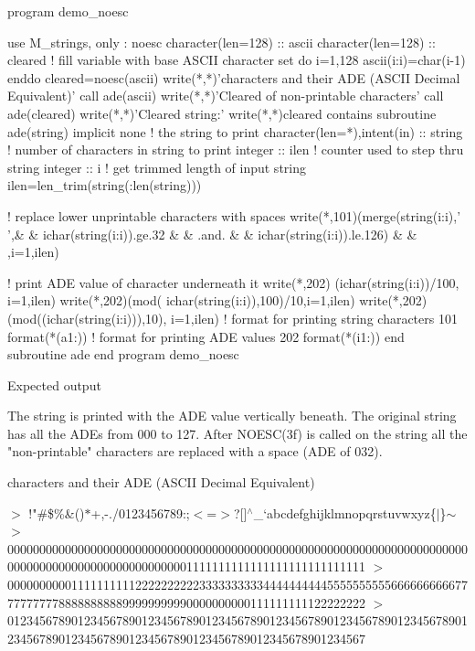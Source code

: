 \begin{DoxyVerb}program demo_noesc

 use M_strings, only : noesc
 character(len=128) :: ascii
 character(len=128) :: cleared
 ! fill variable with base ASCII character set
 do i=1,128
    ascii(i:i)=char(i-1)
 enddo
 cleared=noesc(ascii)
 write(*,*)'characters and their ADE (ASCII Decimal Equivalent)'
 call ade(ascii)
 write(*,*)'Cleared of non-printable characters'
 call ade(cleared)
 write(*,*)'Cleared string:'
 write(*,*)cleared
 contains
   subroutine ade(string)
   implicit none
   ! the string to print
   character(len=*),intent(in) :: string
   ! number of characters in string to print
   integer :: ilen
   ! counter used to step thru string
   integer :: i
      ! get trimmed length of input string
      ilen=len_trim(string(:len(string)))

      ! replace lower unprintable characters with spaces
      write(*,101)(merge(string(i:i),' ',&
      & ichar(string(i:i)).ge.32         &
      & .and.                            &
      & ichar(string(i:i)).le.126)       &
      & ,i=1,ilen)

      ! print ADE value of character underneath it
      write(*,202)     (ichar(string(i:i))/100,    i=1,ilen)
      write(*,202)(mod( ichar(string(i:i)),100)/10,i=1,ilen)
      write(*,202)(mod((ichar(string(i:i))),10),   i=1,ilen)
   ! format for printing string characters
   101   format(*(a1:))
   ! format for printing ADE values
   202   format(*(i1:))
   end subroutine ade
 end program demo_noesc

Expected output

The string is printed with the ADE value vertically beneath.
The original string has all the ADEs from 000 to 127. After
NOESC(3f) is called on the string all the "non-printable"
characters are replaced with a space (ADE of 032).
\end{DoxyVerb}


characters and their A\+DE (A\+S\+C\+II Decimal Equivalent)

$>$ !"\#\$\%\&\textquotesingle{}()$\ast$+,-\/./0123456789\+:;$<$=$>$?\mbox{[}\mbox{]}$^\wedge$\+\_\+`abcdefghijklmnopqrstuvwxyz\{$\vert$\}$\sim$ $>$00000000000000000000000000000000000000000000000000000000000000000000000000000000000000000000000000001111111111111111111111111111 $>$00000000001111111111222222222233333333334444444444555555555566666666667777777777888888888899999999990000000000111111111122222222 $>$01234567890123456789012345678901234567890123456789012345678901234567890123456789012345678901234567890123456789012345678901234567

